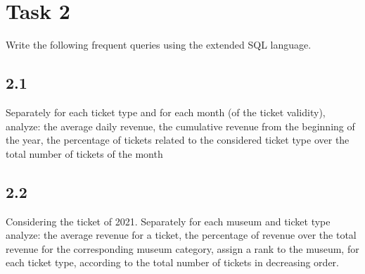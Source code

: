 \section{Task 2}

\begin{question}
    Write the following frequent queries using the extended SQL language.
\end{question}

\subsection{2.1}

\begin{question}
Separately for each ticket type and for each month (of the ticket validity),
analyze: the average daily revenue, the cumulative revenue from the beginning of
the year, the percentage of tickets related to the considered ticket type over the
total number of tickets of the month
\end{question}

\begin{answer}

\end{answer}

\subsection{2.2}

\begin{question}
Considering the ticket of 2021. Separately for each museum and ticket type
analyze: the average revenue for a ticket, the percentage of revenue over the total
revenue for the corresponding museum category, assign a rank to the museum, for
each ticket type, according to the total number of tickets in decreasing order.

\end{question}

\begin{answer}

\end{answer}
